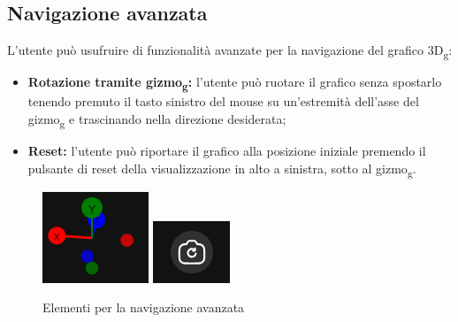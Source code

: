 \subsection{Navigazione avanzata}
L'utente può usufruire di funzionalità avanzate per la navigazione del grafico
3D\textsubscript{g}:
\begin{itemize}
    \item \textbf{Rotazione tramite gizmo\textsubscript{g}:} l'utente può ruotare il grafico
          senza spostarlo tenendo premuto il tasto sinistro del mouse su un'estremità
          dell'asse del gizmo\textsubscript{g} e trascinando nella direzione desiderata;
    \item \textbf{Reset:} l'utente può riportare il grafico alla posizione
          iniziale premendo il pulsante di reset della
          visualizzazione in alto a sinistra, sotto al gizmo\textsubscript{g}.
\end{itemize}
\begin{figure}[ht!]
    \centering
    \includegraphics[scale=0.6]{template/images/gizmo.png}
    \hspace{1cm}
    \includegraphics[scale=0.6]{template/images/resetcam.png}
    \caption{Elementi per la navigazione avanzata}
\end{figure}

